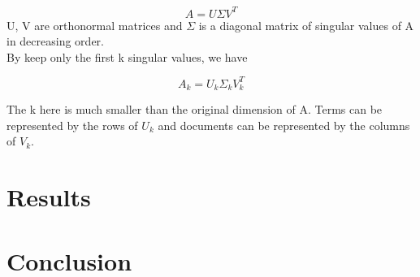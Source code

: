 \documentclass[12pt]{article}
\begin{document}
            \[
                A = U \Sigma V^{T}
            \]
            U, V are orthonormal matrices and $\Sigma$ is a diagonal matrix of 
            singular values of A in decreasing order.
            \\
            By keep only the first k singular values, we have

            \[
                A_k = U_k \Sigma_k V_k^{T}
            \]

            The k here is much smaller than the original dimension of A.
            Terms can be represented by the rows of $U_k$ and documents can be
            represented by the columns of $V_k$.
            
            

\section{Results}
\lipsum[5-6] %

\section{Conclusion}
\lipsum[7] %
\end{document}
